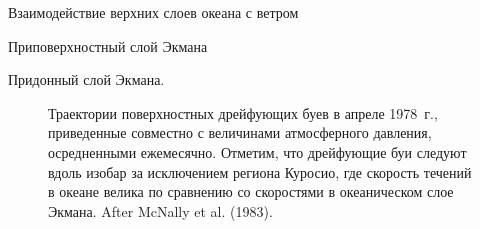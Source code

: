 \begin{chapter}{Взаимодействие верхних слоев океана с ветром}
\begin{section}{Приповерхностный слой Экмана}
\begin{paragraph}{Придонный слой Экмана.}
\begin{figure}[t!]
\caption{Траектории поверхностных дрейфующих 
буев в апреле 1978~г.,
приведенные совместно с величинами атмосферного давления, осредненными
ежемесячно. Отметим, что дрейфующие буи следуют вдоль изобар
за исключением региона Куросио,
где скорость течений в океане велика по сравнению со скоростями в океаническом
слое Экмана. After McNally et al. (1983).}
\label{fig:drifterplot}
\end{figure}
%
\end{paragraph}


\end{section}
\end{chapter}
